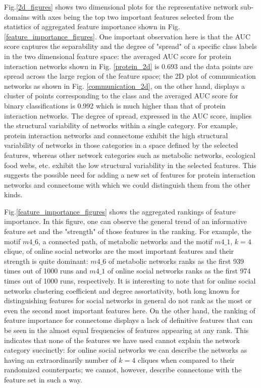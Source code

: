\documentclass{article}
\begin{document}
Fig.\ref{2d_figures} shows two dimensional plots for the representative network sub-domains with axes being the top two important features selected from the statistics of aggregated feature importance shown in Fig. \ref{feature_importance_figures}. One important observation here is that the AUC score captures the separability and the degree of "spread" of a specific class labels in the two dimensional feature space: the averaged AUC score for protein interaction networks shown in Fig. \ref{protein_2d} is 0.693 and the data points are spread across the large region of the feature space; the 2D plot of communication networks as shown in Fig. \ref{communication_2d}, on the other hand, displays a cluster of points corresponding to the class and the averaged AUC score for binary classifications is 0.992 which is much higher than that of protein interaction networks. The degree of spread, expressed in the AUC score, implies the structural variability of networks within a single category. For example, protein interaction networks and connectome exhibit the high structural variability of networks in those categories in a space defined by the selected features, whereas other network categories such as metabolic networks, ecological food webs, etc. exhibit the low structural variability in the selected features. This suggests the possible need for adding a new set of features for protein interaction networks and connectome with which we could distinguish them from the other kinds. 


Fig.\ref{feature_importance_figures} shows the aggregated rankings of feature importance. In this figure, one can observe the general trend of an informative feature set and the "strength" of those features in the ranking. For example, the motif $m4\_6$, a connected path, of metabolic networks and the motif $m4\_1$, $k=4$ clique, of online social networks are the most important features and their strength is quite dominant:  $m4\_6$ of metabolic networks ranks as the first 939 times out of 1000 runs and $m4\_1$ of online social networks ranks as the first 974 times  out of 1000 runs, respectively. It is interesting to note that for online social networks clustering coefficient and degree assortativity, both long known for distinguishing features for social networks in general do not rank as the most or even the second most important features here.  On the other hand, the ranking of feature importance for connectome displays a lack of definitive features that can be seen in the almost equal frequencies of features appearing at any rank. This indicates that none of the features we have used cannot explain the network category succinctly: for online social networks we can describe the networks as having an extraordinarily number of $k=4$ cliques when compared to their randomized counterparts; we cannot, however, describe connectome with the feature set in such a way.
\end{document}
